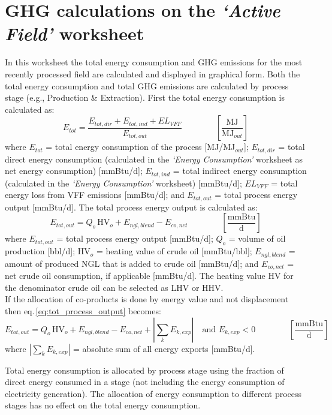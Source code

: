 \documentclass[11pt]{report}
\newcommand{\sheet}[1]{\textit{`{#1}'}}
\newcommand{\eqnunitfrac}[2]{\quad\quad \scriptstyle{\left[\frac{\text{#1}}{\text{#2}}\right]}}
\begin{document}
\section{GHG calculations on the \sheet{Active Field} worksheet}
In this worksheet the total energy consumption and GHG emissions for the most recently processed field are calculated and displayed in graphical form. Both the total energy consumption and total GHG emissions are calculated by process stage (e.g., Production \& Extraction). First the total energy consumption is calculated as:
\begin{equation} 
E_{tot} = \frac{E_{tot,dir} + E_{tot,ind} + EL_{VFF}}{E_{tot,out}} \quad\quad\eqnunitfrac{MJ}{MJ$_{out}$}
\end{equation}
where $E_{tot}$ = total energy consumption of the process [MJ/MJ$_{out}$]; $E_{tot,dir}$ = total direct energy consumption (calculated in the \sheet{Energy Consumption} worksheet as net energy consumption) [mmBtu/d]; $E_{tot,ind}$ = total indirect energy consumption (calculated in the \sheet{Energy Consumption} worksheet) [mmBtu/d]; $EL_{VFF}$ = total energy loss from VFF emissions [mmBtu/d]; and $E_{tot,out}$ = total process energy output [mmBtu/d]. The total process energy output is calculated as: 
\begin{equation}\label{eq:tot_process_output}
E_{tot,out} = Q_{o}\,\text{HV}_{o} + E_{ngl,blend} - E_{co,net}  \quad\quad\eqnunitfrac{mmBtu}{d}
\end{equation}
where $E_{tot,out}$ = total process energy output [mmBtu/d]; $Q_{o}$ = volume of oil production [bbl/d]; HV$_{o}$ = heating value of crude oil [mmBtu/bbl]; \newline $E_{ngl,blend}$ = amount of produced NGL that is added to crude oil [mmBtu/d]; and $E_{co,net}$ = net crude oil consumption, if applicable [mmBtu/d]. The heating value HV for the denominator crude oil can be selected as LHV or HHV.\\
If the allocation of co-products is done by energy value and not displacement then eq.\,\eqref{eq:tot_process_output} becomes:
\begin{equation} 
E_{tot,out} = Q_{o}\,\text{HV}_{o} + E_{ngl,blend} - E_{co,net} + |\sum_k E_{k,exp}| \quad\text{and}\,\, E_{k,exp}< 0  \quad\quad\eqnunitfrac{mmBtu}{d}
\end{equation}
where $|\sum_k E_{k,exp}|$ = absolute sum of all energy exports [mmBtu/d].

Total energy consumption is allocated by process stage using the fraction of direct energy consumed in a stage (not including the energy consumption of electricity generation). The allocation of energy consumption to different process stages has no effect on the total energy consumption.
\end{document}

